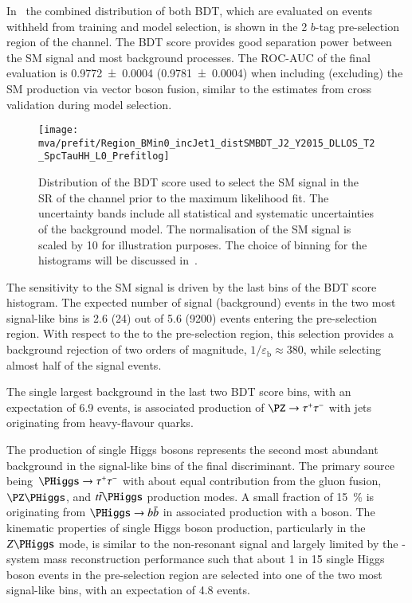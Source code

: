 In~ the combined distribution of both BDT,
which are evaluated on events withheld from training and model
selection, is shown in the 2 $b$-tag pre-selection region of the
\hadhad channel. The BDT score provides good separation power between
the SM \HH signal and most background processes. The ROC-AUC of the
final evaluation is \num{0.9772 +- 0.0004} (\num{0.9781 +- 0.0004})
when including (excluding) the SM \HH production via vector boson
fusion, similar to the estimates from cross validation during model
selection.

\begin{figure}[htbp]
  \centering

  \texttt{[image: mva/prefit/Region\_BMin0\_incJet1\_distSMBDT\_J2\_Y2015\_DLLOS\_T2\_SpcTauHH\_L0\_Prefitlog]}

  \caption{Distribution of the BDT score used to select the SM \HH
    signal in the SR of the \hadhad channel prior to the maximum
    likelihood fit. The uncertainty bands include all statistical and
    systematic uncertainties of the background model. The
    normalisation of the SM \HH signal is scaled by 10 for
    illustration purposes. The choice of binning for the histograms
    will be discussed in~.}
  \label{fig:mva_smbdt_prefit}
\end{figure}

The sensitivity to the SM \HH signal is driven by the last bins of the
BDT score histogram.  The expected number of signal (background)
events in the two most signal-like bins is 2.6 (24) out of 5.6 (9200)
events entering the pre-selection region. With respect to the to the
pre-selection region, this selection provides a background rejection
of two orders of magnitude, $1 / \varepsilon_{\text{b}} \approx 380$,
while selecting almost half of the signal events.

The single largest background in the last two BDT score bins, with an
expectation of 6.9 events, is associated production of
$\PZ \rightarrow \tautau$ with jets originating from heavy-flavour
quarks.

The production of single Higgs bosons represents the second most
abundant background in the signal-like bins of the final
discriminant. The primary source being~$\PHiggs \rightarrow \tautau$
with about equal contribution from the gluon fusion, $\PZ\PHiggs$, and
$\ttbar\PHiggs$ production modes. A small fraction of
\SI{15}{\percent} is originating from $\PHiggs \rightarrow \bbbar$ in
associated production with a \PZ boson. The kinematic properties of
single Higgs boson production, particularly in the $Z\PHiggs$ mode, is
similar to the non-resonant \HH signal and largely limited by the
\PHiggs-system mass reconstruction performance such that about 1 in 15
single Higgs boson events in the pre-selection region are selected
into one of the two most signal-like bins, with an expectation of 4.8
events.

